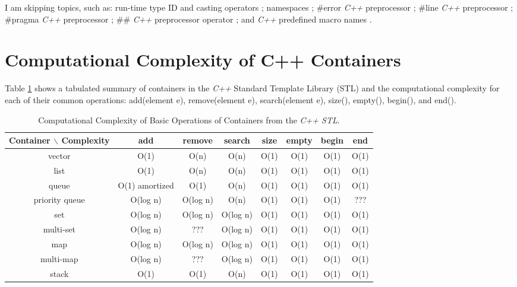 	I am skipping topics, such as: run-time type ID and casting operators \cite[Chp. 19, pp. 451--470]{Schildt2003a}; namespaces \cite[pp. 472--480]{Schildt2003a}; \#error {\it C++} preprocessor \cite[pp. 552]{Schildt2003a}; \#line {\it C++} preprocessor \cite[pp. 558]{Schildt2003a}; \#pragma {\it C++} preprocessor \cite[pp. 559]{Schildt2003a}; \#\# {\it C++} preprocessor operator \cite[pp. 559--560]{Schildt2003a}; and {\it C++} predefined macro names \cite[pp. 560--561]{Schildt2003a}.





\section{Computational Complexity of C++ Containers}
\label{sec:ComputationalComplexityofCppContainers}


	Table \ref{tab:ComputationalComplexityofCppContainers} shows a tabulated summary of containers in the {\it C++} Standard Template Library (STL) and the computational complexity for each of their common operations: add(element e), remove(element e), search(element e), size(), empty(), begin(), and end(). \\

\begin{table}[htp]
\caption{Computational Complexity of Basic Operations of Containers from the {\it C++ STL}.}	\vspace{-0.2in}
\label{tab:ComputationalComplexityofCppContainers}
	\begin{center}
		\begin{tabular}{|c|c|c|c|c|c|c|c|}
		\hline
		Container $\backslash$ Complexity & add & remove & search & size & empty & begin & end \\
		\hline
		vector & O(1) & O(n) & O(n) & O(1) & O(1) & O(1) & O(1) \\
		\hline
		list & O(1) & O(n) & O(n) & O(1) & O(1) & O(1) & O(1) \\
		\hline
		queue & O(1) amortized & O(1) & O(n) & O(1) & O(1) & O(1) & O(1) \\
		\hline
		priority queue & O(log n) & O(log n) & O(n) & O(1) & O(1) & O(1) & ??? \\
		\hline
		set & O(log n) & O(log n) & O(log n) & O(1) & O(1) & O(1) & O(1) \\
		\hline
		multi-set & O(log n) & ??? & O(log n) & O(1) & O(1) & O(1) & O(1) \\
		\hline
		map & O(log n) & O(log n) & O(log n) & O(1) & O(1) & O(1) & O(1) \\
		\hline
		multi-map & O(log n) & ??? & O(log n) & O(1) & O(1) & O(1) & O(1) \\
		\hline
		stack & O(1) & O(1) & O(n) & O(1) & O(1) & O(1) & O(1) \\
		\hline
		\end{tabular}
	\end{center}
\end{table}


